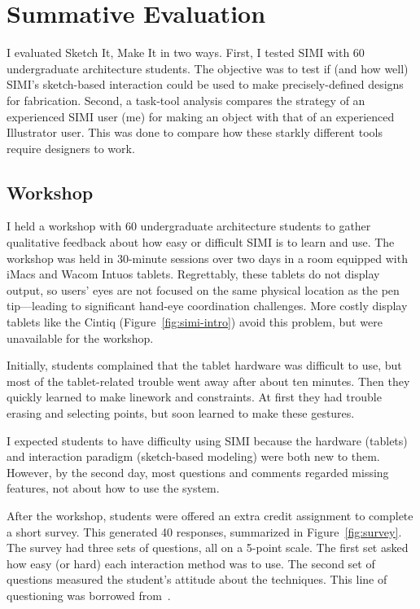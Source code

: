 \chapter{Summative Evaluation}

I evaluated Sketch It, Make It in two ways. First, I tested SIMI
with 60 undergraduate architecture students. The objective was to test
if (and how well) SIMI's sketch-based interaction could be used to
make precisely-defined designs for fabrication. Second, a task-tool
analysis compares the strategy of an experienced SIMI user (me) for
making an object with that of an experienced Illustrator user. This
was done to compare how these starkly different tools require
designers to work.



\section{Workshop}

I held a workshop with 60 undergraduate architecture students to
gather qualitative feedback about how easy or difficult SIMI is to
learn and use. The workshop was held in 30-minute sessions over two
days in a room equipped with iMacs and Wacom Intuos
tablets. Regrettably, these tablets do not display output, so users'
eyes are not focused on the same physical location as the pen
tip---leading to significant hand-eye coordination challenges. More
costly display tablets like the Cintiq (Figure~\ref{fig:simi-intro})
avoid this problem, but were unavailable for the workshop.

Initially, students complained that the tablet hardware was difficult
to use, but most of the tablet-related trouble went away after about
ten minutes. Then they quickly learned to make linework and
constraints. At first they had trouble erasing and selecting points,
but soon learned to make these gestures.

I expected students to have difficulty using SIMI because the hardware
(tablets) and interaction paradigm (sketch-based modeling) were both
new to them. However, by the second day, most questions and comments
regarded missing features, not about how to use the system.

After the workshop, students were offered an extra credit assignment
to complete a short survey. This generated 40 responses, summarized in
Figure~\ref{fig:survey}. The survey had three sets of questions, all
on a 5-point scale. The first set asked how easy (or hard) each
interaction method was to use. The second set of questions measured
the student's attitude about the techniques. This line of questioning
was borrowed from~\cite{bae-everybody}.


